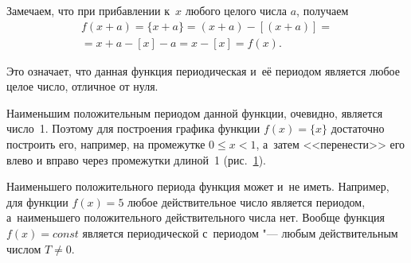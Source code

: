 Замечаем, что при прибавлении к~$x$ любого целого числа $a$, получаем
\begin{multline}
f(x+a) = \{x+a\} = (x+a) - [(x+a)] = \\
= x+a - [x] - a = x - [x] = f(x).
\end{multline}

Это означает, что данная функция периодическая и~её периодом является
любое целое число, отличное от нуля.

Наименьшим положительным периодом данной функции, очевидно, является число~1.
Поэтому для построения графика функции $f(x) = \{x\}$ достаточно построить его,
например, на промежутке $0 \leqslant x  <  1$,  а~затем <<перенести>> его
влево и вправо через промежутки длиной~1 (рис.\ \ref{fig_1_9_18}).

\begin{figure}\label{fig_1_9_18}
\end{figure}

\begin{Note} Наименьшего положительного периода функция может и~не иметь.
Например, для функции $f(x) = 5$ любое действительное число является периодом,
а~наименьшего положительного действительного числа нет. Вообще функция $f(x) = const$
является периодической с~периодом "--- любым действительным числом $T \ne 0$.
\end{Note}


